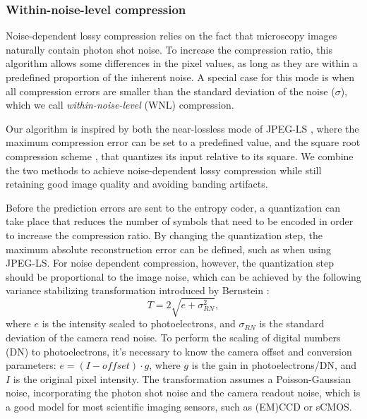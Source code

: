     \subsubsection{Within-noise-level compression}
    \label{sec:wnl}
    Noise-dependent lossy compression relies on the fact that microscopy images naturally contain photon shot noise. To increase the compression ratio, this algorithm allows some differences in the pixel values, as long as they are within a predefined proportion of the inherent noise. A special case for this mode is when all compression errors are smaller than the standard deviation of the noise ($\sigma$), which we call \textit{within-noise-level} (WNL) compression.

    Our algorithm is inspired by both the near-lossless mode of JPEG-LS \cite{weinberger_loco-i_2000}, where the maximum compression error can be set to a predefined value, and the square root compression scheme \cite{gowen_square_2003, bernstein_noise_2010}, that quantizes its input relative to its square. We combine the two methods to achieve noise-dependent lossy compression while still retaining good image quality and avoiding banding artifacts.

    Before the prediction errors are sent to the entropy coder, a quantization can take place that reduces the number of symbols that need to be encoded in order to increase the compression ratio. By changing the quantization step, the maximum absolute reconstruction error can be defined, such as when using JPEG-LS. For noise dependent compression, however, the quantization step should be proportional to the image noise, which can be achieved by the following variance stabilizing transformation introduced by Bernstein \etal \cite{bernstein_noise_2010}:
    \begin{equation}
      T = 2 \sqrt{e + \sigma^2_{RN}},
      \label{eq:wnl}
    \end{equation}    
    where $e$ is the intensity scaled to photoelectrons, and $\sigma_{RN}$ is the standard deviation of the camera read noise. To perform the scaling of digital numbers (DN) to photoelectrons, it’s necessary to know the camera offset and conversion parameters: $e=(I-offset)\cdot g$, where $g$ is the gain in photoelectrons/DN, and $I$ is the original pixel intensity. The transformation assumes a Poisson-Gaussian noise, incorporating the photon shot noise and the camera readout noise, which is a good model for most scientific imaging sensors, such as (EM)CCD or sCMOS.

